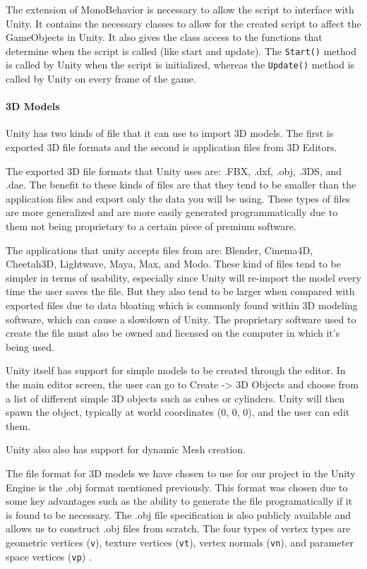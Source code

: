 \documentclass[12pt]{article}
\begin{document}
The extension of MonoBehavior is necessary to allow the script to
interface with Unity. It contains the necessary classes to allow for the
created script to affect the GameObjects in Unity. It also gives the
class access to the functions that determine when the script is called
(like start and update). The \texttt{Start()} method is called by Unity
when the script is initialized, whereas the \texttt{Update()} method is
called by Unity on every frame of the game. \autocite{unityScripts}

\paragraph{3D Models}\label{d-models}

Unity has two kinds of file that it can use to import 3D models. The
first is exported 3D file formats and the second is application files
from 3D Editors.

The exported 3D file formats that Unity uses are: .FBX, .dxf, .obj,
.3DS, and .dae. The benefit to these kinds of files are that they tend
to be smaller than the application files and export only the data you
will be using. These types of files are more generalized and are more
easily generated programmatically due to them not being proprietary to a
certain piece of premium software.

The applications that unity accepts files from are: Blender, Cinema4D,
Cheetah3D, Lightwave, Maya, Max, and Modo. These kind of files tend to
be simpler in terms of usability, especially since Unity will re-import
the model every time the user saves the file. But they also tend to be
larger when compared with exported files due to data bloating which is
commonly found within 3D modeling software, which can cause a slowdown
of Unity. The proprietary software used to create the file must also be
owned and licensed on the computer in which it's being used.

Unity itself has support for simple models to be created through the
editor. In the main editor screen, the user can go to Create
-\textgreater{} 3D Objects and choose from a list of different simple 3D
objects such as cubes or cylinders. Unity will then spawn the object,
typically at world coordinates (0, 0, 0), and the user can edit them.

Unity also also has support for dynamic Mesh creation.

The file format for 3D models we have chosen to use for our project in
the Unity Engine is the .obj format mentioned previously. This format
was chosen due to some key advantages such as the ability to generate
the file programatically if it is found to be necessary. The .obj file
specification is also publicly available and allows us to construct .obj
files from scratch. The four types of vertex types are geometric
vertices (\texttt{v}), texture vertices (\texttt{vt}), vertex normals
(\texttt{vn}), and parameter space vertices (\texttt{vp})
\autocite{obj}.
\end{document}
